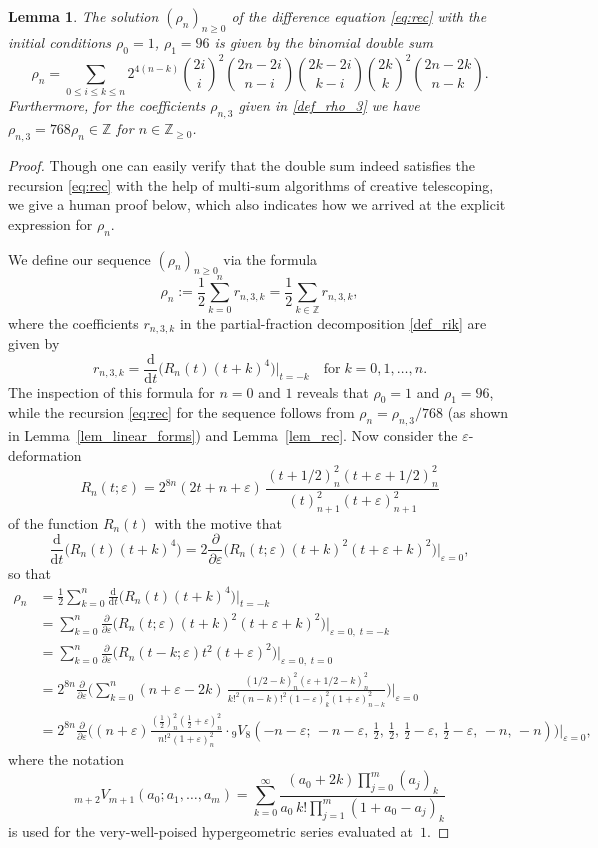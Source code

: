 \documentclass[12pt]{article}
\let\le\leqslant
\let\ge\geqslant
\let\eps\varepsilon
\let\p\partial
\renewcommand{\d}{\mathrm{d}}
\newtheorem{lemma}[theorem]{Lemma}
\theoremstyle{remark}
\numberwithin{equation}{section}
\begin{document}
\begin{lemma}
\label{lem:rho0}
The solution $(\rho_n)_{n\ge0}$ of the difference equation \eqref{eq:rec} with the initial conditions $\rho_0=1$, $\rho_1=96$ is given by the binomial double sum
\[
\rho_n=\sum_{0\le i\le k\le n}2^{4(n-k)}{\binom{2i}i}^2\binom{2n-2i}{n-i}\binom{2k-2i}{k-i}{\binom{2k}k}^2\binom{2n-2k}{n-k}.
\]
Furthermore, for the coefficients $\rho_{n,3}$ given in \eqref{def_rho_3} we have $\rho_{n,3}=768\rho_n\in\mathbb Z$ for $n\in\mathbb Z_{\ge0}$.
\end{lemma}

\begin{proof}
Though one can easily verify that the double sum indeed satisfies the recursion \eqref{eq:rec} with the help of multi-sum algorithms of creative telescoping, we give a human proof below, which also indicates how we arrived at the explicit expression for $\rho_n$.

We define our sequence $(\rho_n)_{n\ge0}$ via the formula
\[
\rho_n:=\frac12\sum_{k=0}^nr_{n,3,k}=\frac12\sum_{k\in\mathbb Z}r_{n,3,k},
\]
where the coefficients $r_{n,3,k}$ in the partial-fraction decomposition \eqref{def_rik} are given by
\[
r_{n,3,k}=\frac{\d}{\d t}\big(R_n(t)(t+k)^4\big)\Big|_{t=-k} \quad\text{for}\; k=0,1,\dots,n.
\]
The inspection of this formula for $n=0$ and $1$ reveals that $\rho_0=1$ and $\rho_1=96$, while the recursion \eqref{eq:rec} for the sequence follows from $\rho_n=\rho_{n,3}/768$ (as shown in Lemma~\ref{lem_linear_forms}) and Lemma~\ref{lem_rec}.
Now consider the $\eps$-deformation
\[
R_n(t;\eps)=2^{8n}(2t+n+\eps)\,\frac{(t+1/2)_n^2(t+\eps+1/2)_n^2}{(t)_{n+1}^2(t+\eps)_{n+1}^2}
\]
of the function $R_n(t)$ with the motive that
\[
\frac{\d}{\d t}\big(R_n(t)(t+k)^4\big)
=2\frac{\p}{\p\eps}\big(R_n(t;\eps)(t+k)^2(t+\eps+k)^2\big)\bigg|_{\eps=0},
\]
so that
\begin{align*}
\rho_n
&=\frac12\sum_{k=0}^n\frac{\d}{\d t}\big(R_n(t)(t+k)^4\big)\bigg|_{t=-k}
\\
&=\sum_{k=0}^n\frac{\p}{\p\eps}\big(R_n(t;\eps)(t+k)^2(t+\eps+k)^2\big)\bigg|_{\eps=0,\;t=-k}
\\
&=\sum_{k=0}^n\frac{\p}{\p\eps}\big(R_n(t-k;\eps)t^2(t+\eps)^2\big)\bigg|_{\eps=0,\;t=0}
\\
&=2^{8n}\frac{\p}{\p\eps}\bigg(\sum_{k=0}^n
(n+\eps-2k)\,\frac{(1/2-k)_n^2(\eps+1/2-k)_n^2}{k!^2(n-k)!^2(1-\eps)_k^2(1+\eps)_{n-k}^2}
\bigg)\bigg|_{\eps=0}
\\
&=2^{8n}\frac{\p}{\p\eps}\bigg((n+\eps)\frac{(\frac12)_n^2(\frac12+\eps)_n^2}{n!^2(1+\eps)_n^2}
\cdot
{}_9V_8(-n-\eps; \, -n-\eps, \, \tfrac12, \, \tfrac12, \, \tfrac12-\eps, \, \tfrac12-\eps, \, -n, \, -n)\bigg)\bigg|_{\eps=0},
\end{align*}
where the notation
\begin{equation}\label{eq:def-very-well-poised}
{}_{m+2}V_{m+1}(a_0;a_1,\dots,a_m)
=\sum_{k=0}^\infty\frac{(a_0+2k)\prod_{j=0}^m(a_j)_k}{a_0\,k!\prod_{j=1}^m(1+a_0-a_j)_k}
\end{equation}
is used for the very-well-poised hypergeometric series evaluated at~$1$.


\end{proof}
\end{document}
